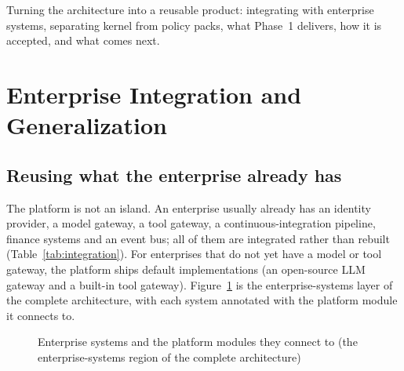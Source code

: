 {Turning the architecture into a reusable product: integrating with enterprise systems, separating kernel from policy packs, what Phase~1 delivers, how it is accepted, and what comes next.}

\section{Enterprise Integration and Generalization}
\label{sec:integration}

\subsection{Reusing what the enterprise already has}

The platform is not an island. An enterprise usually already has an identity provider, a model gateway, a tool gateway, a continuous-integration pipeline, finance systems and an event bus; all of them are integrated rather than rebuilt (Table~\ref{tab:integration}). For enterprises that do not yet have a model or tool gateway, the platform ships default implementations (an open-source LLM gateway and a built-in tool gateway). Figure~\ref{fig:zoom-ent} is the enterprise-systems layer of the complete architecture, with each system annotated with the platform module it connects to.

\begin{figure}[htbp]
\centering
{}
\caption[Enterprise systems and their integration points]{Enterprise systems and the platform modules they connect to (the enterprise-systems region of the complete architecture)}
\label{fig:zoom-ent}
\end{figure}

